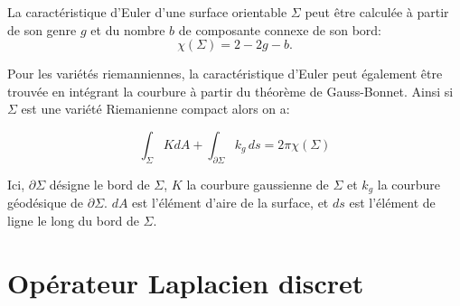 La caractéristique d'Euler d'une surface orientable $\Sigma$ peut être calculée à partir de son genre $g$ et du nombre $b$ de composante connexe de son bord:
$$
\chi(\Sigma) = 2-2g-b.
$$

Pour les variétés riemanniennes, la caractéristique d'Euler peut également être trouvée en intégrant la courbure à partir du théorème de Gauss-Bonnet. Ainsi si $\Sigma$ est une variété Riemanienne compact alors on a:

$$
\displaystyle\int_\Sigma KdA+\int_{\partial\Sigma} k_{g}\,ds=2\pi \chi (\Sigma)
$$

Ici, $\partial\Sigma$ désigne le bord de $\Sigma$, $K$ la courbure gaussienne de $\Sigma$ et $k_g$ la courbure géodésique de $\partial\Sigma$. $dA$ est l'élément d'aire de la surface, et $ds$ est l'élément de ligne le long du bord de $\Sigma$.


\section{Opérateur Laplacien discret}

